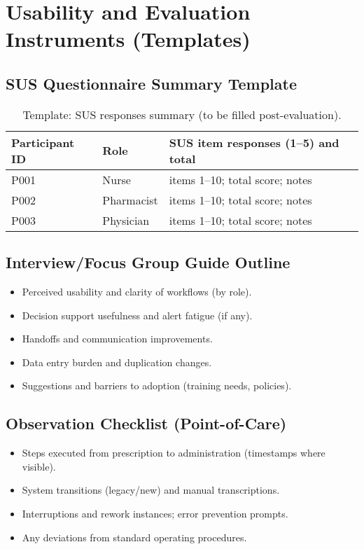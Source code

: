\section{Usability and Evaluation Instruments (Templates)}
\subsection{SUS Questionnaire Summary Template}
\begin{table}[H]
    \centering
    \caption{Template: SUS responses summary (to be filled post-evaluation).}
    \label{tab:template_sus}
    \begin{tabularx}{\textwidth}{@{}l l X@{}}
        \toprule
        \textbf{Participant ID} & \textbf{Role} & \textbf{SUS item responses (1--5) and total} \\
        \midrule
        P001 & Nurse & items 1--10; total score; notes \\
        P002 & Pharmacist & items 1--10; total score; notes \\
        P003 & Physician & items 1--10; total score; notes \\
        \bottomrule
    \end{tabularx}
\end{table}

\subsection{Interview/Focus Group Guide Outline}
\begin{itemize}
    \item Perceived usability and clarity of workflows (by role).
    \item Decision support usefulness and alert fatigue (if any).
    \item Handoffs and communication improvements.
    \item Data entry burden and duplication changes.
    \item Suggestions and barriers to adoption (training needs, policies).
\end{itemize}

\subsection{Observation Checklist (Point-of-Care)}
\begin{itemize}
    \item Steps executed from prescription to administration (timestamps where visible).
    \item System transitions (legacy/new) and manual transcriptions.
    \item Interruptions and rework instances; error prevention prompts.
    \item Any deviations from standard operating procedures.
\end{itemize}

